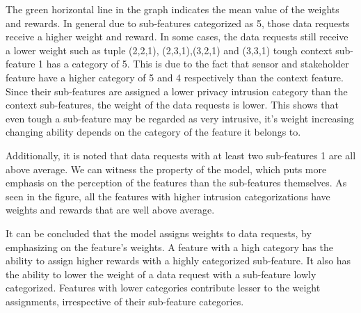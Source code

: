 %

The green horizontal line in the graph indicates the mean value of the weights and rewards. In general due to sub-features categorized as 5, those data requests receive a higher weight and reward. In some cases, the data requests still receive a lower weight such as tuple (2,2,1),
(2,3,1),(3,2,1) and (3,3,1) tough context sub-feature 1 has a category of 5. This is due to the fact that sensor and stakeholder feature have a higher category of 5 and 4 respectively than the context feature. Since their sub-features are assigned a lower privacy intrusion category than the context sub-features, the weight of the data requests is lower. This shows that even tough a sub-feature may be regarded as very intrusive, it's weight increasing changing ability depends on the category of the feature it belongs to.

Additionally, it is noted that data requests with at least two sub-features 1 are all above average. We can witness the property of the model, which puts more emphasis on the perception of the features than the sub-features themselves. As seen in the figure, all the features with higher intrusion categorizations have weights and rewards that are well above average.

It can be concluded that the model assigns weights to data requests, by emphasizing on the feature's weights. A feature with a high category
has the ability to assign higher rewards with a highly categorized sub-feature. It also has the ability to lower the weight of a data request with a sub-feature lowly
categorized. Features with lower categories contribute lesser to the weight assignments, irrespective of their sub-feature categories.







